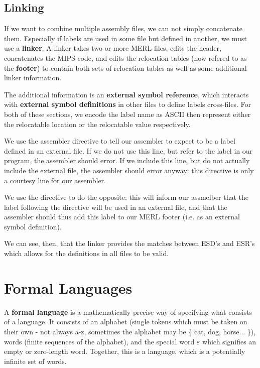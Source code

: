 \documentclass[12pt]{article}
\begin{document}
\subsection*{Linking}
If we want to combine multiple assembly files, we can not simply concatenate them. Especially if labels are used in some file but defined in another, we must use a {\bf linker}. A linker takes two or more MERL files, edits the header, concatenates the MIPS code, and edits the relocation tables (now refered to as the {\bf footer}) to contain both sets of relocation tables as well as some additional linker information.

The additional information is an {\bf external symbol reference}, which interacts with {\bf external symbol definitions} in other files to define labels cross-files. For both of these sections, we encode the label name as ASCII then represent either the relocatable location or the relocatable value respectively.

We use the assembler directive  to tell our assembler to expect  to be a label defined in an external file. If we do not use this line, but refer to the  label in our program, the assembler should error. If we include this line, but do not actually include the external file, the assembler should error anyway: this  directive is only a courtesy line for our assembler.

We use the  directive to do the opposite: this will inform our assmelber that the label following the directive will be used in an external file, and that the assembler should thus add this label to our MERL footer (i.e. as an external symbol definition).

We can see, then, that the linker provides the matches between ESD's and ESR's which allows for the definitions in all files to be valid.

\section*{Formal Languages}
A {\bf formal language} is a mathematically precise way of specifying what consists of a language. It consists of an alphabet (single tokens which must be taken on their own - not always a-z, sometimes the alphabet may be \{ cat, dog, horse... \}), words (finite sequences of the alphabet), and the special word $\varepsilon$ which signifies an empty or zero-length word. Together, this is a language, which is a potentially infinite set of words.
\end{document}
